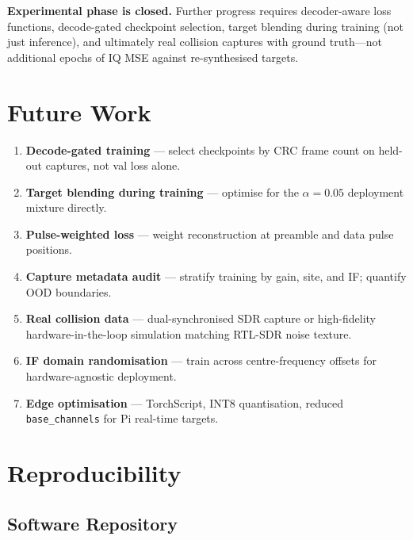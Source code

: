 \documentclass[11pt,a4paper]{article}
\begin{document}
\textbf{Experimental phase is closed.} Further progress requires decoder-aware
loss functions, decode-gated checkpoint selection, target blending during
training (not just inference), and ultimately real collision captures with
ground truth---not additional epochs of IQ MSE against re-synthesised targets.

\section{Future Work}

\begin{enumerate}[leftmargin=*]
  \item \textbf{Decode-gated training} --- select checkpoints by CRC frame
        count on held-out captures, not val loss alone.
  \item \textbf{Target blending during training} --- optimise for the
        $\alpha=0.05$ deployment mixture directly.
  \item \textbf{Pulse-weighted loss} --- weight reconstruction at preamble and
        data pulse positions.
  \item \textbf{Capture metadata audit} --- stratify training by gain, site,
        and IF; quantify OOD boundaries.
  \item \textbf{Real collision data} --- dual-synchronised SDR capture or
        high-fidelity hardware-in-the-loop simulation matching RTL-SDR noise
        texture.
  \item \textbf{IF domain randomisation} --- train across centre-frequency
        offsets for hardware-agnostic deployment.
  \item \textbf{Edge optimisation} --- TorchScript, INT8 quantisation, reduced
        \texttt{base\_channels} for Pi real-time targets.
\end{enumerate}

\appendix
\section{Reproducibility}

\subsection{Software Repository}
\end{document}
